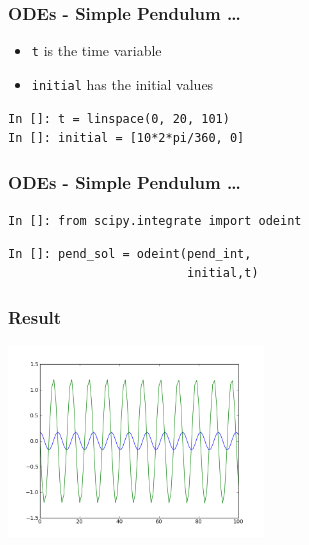\begin{frame}[fragile]
\frametitle{ODEs - Simple Pendulum \ldots}
\begin{itemize}
\item \texttt{t} is the time variable \\ 
\item \texttt{initial} has the initial values
\end{itemize}
\begin{lstlisting}
In []: t = linspace(0, 20, 101)
In []: initial = [10*2*pi/360, 0]
\end{lstlisting} 
\end{frame}

\begin{frame}[fragile]
\frametitle{ODEs - Simple Pendulum \ldots}
\texttt{In []: from scipy.integrate import odeint}
\begin{lstlisting}
In []: pend_sol = odeint(pend_int, 
                         initial,t)
\end{lstlisting}
\end{frame}

\begin{frame}[fragile]
\frametitle{Result}
\begin{center}
\includegraphics[height=2in, interpolate=true]{images/ode}  
\end{center}
\end{frame}




